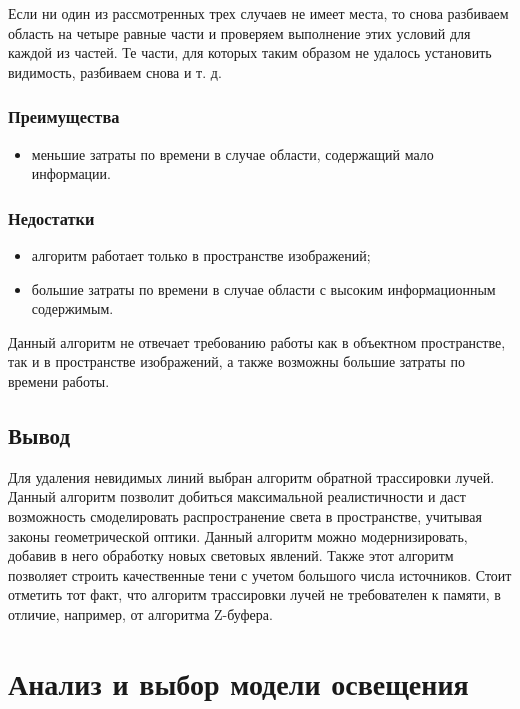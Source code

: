  Если ни один из рассмотренных трех случаев не имеет места, то снова разбиваем область на четыре равные части и проверяем выполнение этих условий для каждой из частей. Те части, для которых таким образом не удалось установить видимость, разбиваем снова и т. д.
 
\subsubsection*{Преимущества}
\begin{itemize}
\item	меньшие затраты по времени в случае области, содержащий мало информации.
\end{itemize}


\subsubsection*{Недостатки}
 \begin{itemize}
\item	алгоритм работает только в пространстве изображений;
\item	большие затраты по времени в случае области с высоким информационным содержимым.
\end{itemize}

 Данный алгоритм не отвечает требованию работы как в объектном пространстве, так и в пространстве изображений, а также возможны большие затраты по времени работы.
 
 
\subsection{Вывод}
Для удаления невидимых линий выбран алгоритм обратной трассировки лучей. Данный алгоритм позволит добиться максимальной реалистичности и даст возможность смоделировать распространение света в пространстве, учитывая законы геометрической оптики. Данный алгоритм можно модернизировать, добавив в него обработку новых световых явлений. Также этот алгоритм позволяет строить качественные тени с учетом большого числа источников. Стоит отметить тот факт, что алгоритм трассировки лучей не требователен к памяти, в отличие, например, от алгоритма Z-буфера.


\section{Анализ и выбор модели освещения}


